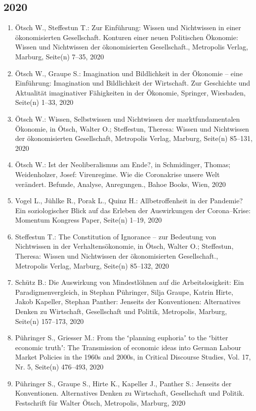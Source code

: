 \subsection*{2020}
\begin{enumerate}
    	 \item Ötsch W., Steffestun T.: Zur Einführung: Wissen und Nichtwissen in einer ökonomisierten Gesellschaft. Konturen einer neuen Politischen Ökonomie: Wissen und Nichtwissen der ökonomisierten Gesellschaft., Metropolis Verlag, Marburg, Seite(n) 7–35, 2020
	 \item Ötsch W., Graupe S.: Imagination und Bildlichkeit in der Ökonomie – eine Einführung: Imagination und Bildlichkeit der Wirtschaft. Zur Geschichte und Aktualität imaginativer Fähigkeiten in der Ökonomie, Springer, Wiesbaden, Seite(n) 1--33, 2020
	 \item Ötsch W.: Wissen, Selbstwissen und Nichtwissen der marktfundamentalen Ökonomie, in Ötsch, Walter O.; Steffestun, Theresa: Wissen und Nichtwissen der ökonomisierten Gesellschaft, Metropolis Verlag, Marburg, Seite(n) 85--131, 2020
	 \item Ötsch W.: Ist der Neoliberalismus am Ende?, in Schmidinger, Thomas; Weidenholzer, Josef: Virenregime. Wie die Coronakrise unsere Welt verändert. Befunde, Analyse, Anregungen., Bahoe Books, Wien, 2020
	 \item Vogel L., Jühlke R., Porak L., Quinz H.: Allbetroffenheit in der Pandemie? Ein soziologischer Blick auf das Erleben der Auswirkungen der Corona--Krise: Momentum Kongress Paper, Seite(n) 1--19, 2020
	 \item Steffestun T.: The Constitution of Ignorance -- zur Bedeutung von Nichtwissen in der Verhaltensökonomie, in Ötsch, Walter O.; Steffestun, Theresa: Wissen und Nichtwissen der ökonomisierten Gesellschaft., Metropolis Verlag, Marburg, Seite(n) 85--132, 2020
	 \item Schütz B.: Die Auswirkung von Mindestlöhnen auf die Arbeitslosigkeit: Ein Paradigmenvergleich, in Stephan Pühringer, Silja Graupe, Katrin Hirte, Jakob Kapeller, Stephan Panther: Jenseits der Konventionen: Alternatives Denken zu Wirtschaft, Gesellschaft und Politik, Metropolis, Marburg, Seite(n) 157--173, 2020
	 \item Pühringer S., Griesser M.: From the ʻplanning euphoriaʼ to the ʻbitter economic truthʼ: The Transmission of economic ideas into German Labour Market Policies in the 1960s and 2000s, in Critical Discourse Studies, Vol. 17, Nr. 5, Seite(n) 476--493, 2020
	 \item Pühringer S., Graupe S., Hirte K., Kapeller J., Panther S.: Jenseits der Konventionen. Alternatives Denken zu Wirtschaft, Gesellschaft und Politik. Festschrift für Walter Ötsch, Metropolis, Marburg, 2020

\end{enumerate}
